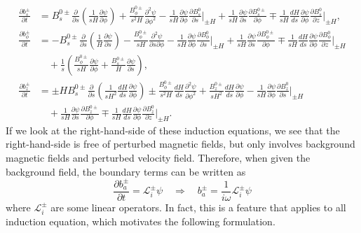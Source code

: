 \begin{equation}
    \begin{aligned}
        \frac{\partial b_s^\pm}{\partial t} &= B_s^{0\pm} \frac{\partial}{\partial s} \left(\frac{1}{sH}\frac{\partial \psi}{\partial \phi}\right) + \frac{B_\phi^{0\pm}}{s^2 H} \frac{\partial^2 \psi}{\partial \phi^2} - \frac{1}{sH} \frac{\partial \psi}{\partial \phi} \frac{\partial B_s^0}{\partial s}\bigg|_{\pm H} + \frac{1}{sH} \frac{\partial \psi}{\partial s} \frac{\partial B_s^{0\pm}}{\partial \phi} \mp \frac{1}{sH} \frac{dH}{ds}\frac{\partial \psi}{\partial \phi} \frac{\partial B_s^0}{\partial z}\bigg|_{\pm H}, \\ 
        \frac{\partial b_\phi^\pm}{\partial t} &= -B_s^{0\pm} \frac{\partial}{\partial s}\left(\frac{1}{H}\frac{\partial \psi}{\partial s}\right) - \frac{B_\phi^{0\pm}}{sH} \frac{\partial^2 \psi}{\partial s \partial \phi} - \frac{1}{sH} \frac{\partial \psi}{\partial \phi} \frac{\partial B_\phi^0}{\partial s}\bigg|_{\pm H} + \frac{1}{sH} \frac{\partial \psi}{\partial s} \frac{\partial B_\phi^{0\pm}}{\partial \phi} \mp \frac{1}{sH} \frac{dH}{ds}\frac{\partial \psi}{\partial \phi} \frac{\partial B_\phi^0}{\partial z}\bigg|_{\pm H} \\
        &\quad + \frac{1}{s}\left(\frac{B_\phi^{0\pm}}{sH}\frac{\partial \psi}{\partial \phi} + \frac{B_s^{0\pm}}{H}\frac{\partial \psi}{\partial s}\right), \\ 
        \frac{\partial b_z^\pm}{\partial t} &= \pm H B_s^{0\pm} \frac{\partial}{\partial s}\left(\frac{1}{sH^2}\frac{dH}{ds}\frac{\partial \psi}{\partial \phi}\right) \pm \frac{B_\phi^{0\pm}}{s^2 H} \frac{dH}{ds} \frac{\partial^2 \psi}{\partial \phi^2} + \frac{B_z^{0\pm}}{sH^2}\frac{dH}{ds}\frac{\partial \psi}{\partial \phi} - \frac{1}{sH}\frac{\partial \psi}{\partial \phi} \frac{\partial B_z^0}{\partial s}\bigg|_{\pm H} \\
        &\quad + \frac{1}{sH} \frac{\partial \psi}{\partial s} \frac{\partial B_z^{0\pm}}{\partial \phi} \mp \frac{1}{sH} \frac{dH}{ds}\frac{\partial \psi}{\partial \phi} \frac{\partial B_z^0}{\partial z}\bigg|_{\pm H}.
    \end{aligned}
\end{equation}
If we look at the right-hand-side of these induction equations, we see that the right-hand-side is free of perturbed magnetic fields, but only involves background magnetic fields and perturbed velocity field. Therefore, when given the background field, the boundary terms can be written as
\[
    \frac{\partial b_a^{\pm}}{\partial t} = \mathcal{L}_i^{\pm} \psi \quad \Longrightarrow \quad b_a^{\pm} = \frac{1}{i\omega} \mathcal{L}_i^\pm \psi
\]
where $\mathcal{L}_i^{\pm}$ are some linear operators. In fact, this is a feature that applies to all induction equation, which motivates the following formulation.

